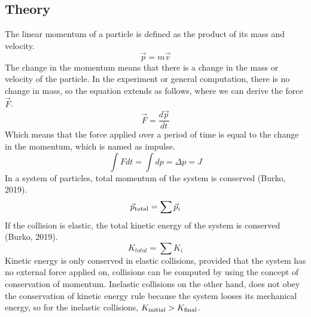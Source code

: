 \documentclass[a4paper, 12pt]{article}
\newcommand{\subhead}[1]{\subsection{\normalsize #1}}
\begin{document}
    \subhead{Theory}
    The linear momentum of a particle is defined as the product of its mass and velocity.
    \begin{equation}
        \vec{p} = m \vec{v}
    \end{equation}
    The change in the momentum means that there is a change in the mass or velocity of the particle. In the
    experiment or general computation, there is no change in mass, so the equation extends as follows,
    where we can derive the force $\vec{F}$.
    \begin{equation}
        \vec{F} = \frac{d\vec{p}}{dt}
    \end{equation}
    Which means that the force applied over a period of time is equal to the change in the momentum, which
    is named as impulse.
    \begin{equation}
        \int F dt = \int dp = \Delta p = J
    \end{equation}
    In a system of particles, total momentum of the system is conserved (Burko, 2019).
    \begin{equation}
        \vec{p}_{\textnormal{total}} = \sum \vec{p}_i
        \label{eq:conserve_p}
    \end{equation}
    If the collision is elastic, the total kinetic energy of the system is conserved (Burko, 2019).
    \begin{equation}
        K_{total} = \sum K_i
        \label{eq:conserve_K}
    \end{equation}
    Kinetic energy is only conserved in elastic collisions, provided that the system has no external force
    applied on, collisions can be computed by using the concept of conservation of momentum. Inelastic
    collisions on the other hand, does not obey the conservation of kinetic energy rule because the system
    looses its mechanical energy, so for the inelastic collisions, $K_{\textnormal{initial}} > K_{\textnormal{final}}$.
\end{document}

